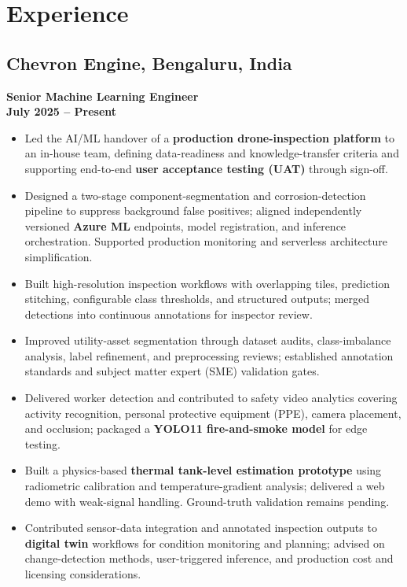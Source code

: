 \documentclass[a4paper,10pt]{article}
\begin{document}
	\section{Experience}
	
\subsection{Chevron Engine, Bengaluru, India} 
\textbf{Senior Machine Learning Engineer} \\
\hfill \textbf{July 2025 -- Present} 

\begin{itemize}
\item Led the AI/ML handover of a \textbf{production drone-inspection platform} to an in-house team, defining data-readiness and knowledge-transfer criteria and supporting end-to-end \textbf{user acceptance testing (UAT)} through sign-off.

\item Designed a two-stage component-segmentation and corrosion-detection pipeline to suppress background false positives; aligned independently versioned \textbf{Azure ML} endpoints, model registration, and inference orchestration. Supported production monitoring and serverless architecture simplification.

\item Built high-resolution inspection workflows with overlapping tiles, prediction stitching, configurable class thresholds, and structured outputs; merged detections into continuous annotations for inspector review.

\item Improved utility-asset segmentation through dataset audits, class-imbalance analysis, label refinement, and preprocessing reviews; established annotation standards and subject matter expert (SME) validation gates.

\item Delivered worker detection and contributed to safety video analytics covering activity recognition, personal protective equipment (PPE), camera placement, and occlusion; packaged a \textbf{YOLO11 fire-and-smoke model} for edge testing.

\item Built a physics-based \textbf{thermal tank-level estimation prototype} using radiometric calibration and temperature-gradient analysis; delivered a web demo with weak-signal handling. Ground-truth validation remains pending.

\item Contributed sensor-data integration and annotated inspection outputs to \textbf{digital twin} workflows for condition monitoring and planning; advised on change-detection methods, user-triggered inference, and production cost and licensing considerations.


\end{itemize}
\end{document}
